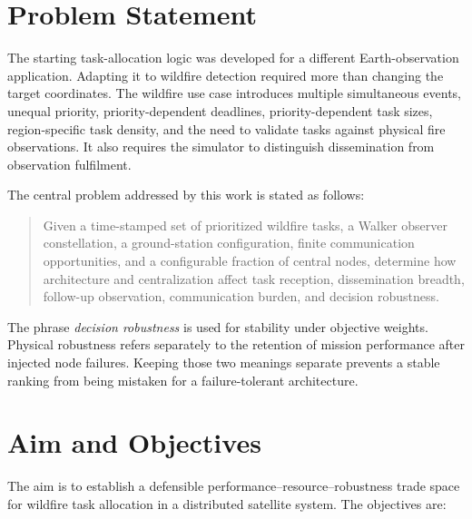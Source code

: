 \section{Problem Statement}

The starting task-allocation logic was developed for a different Earth-observation application. Adapting it to wildfire detection required more than changing the target coordinates. The wildfire use case introduces multiple simultaneous events, unequal priority, priority-dependent deadlines, priority-dependent task sizes, region-specific task density, and the need to validate tasks against physical fire observations. It also requires the simulator to distinguish dissemination from observation fulfilment.

The central problem addressed by this work is stated as follows:

\begin{quote}
Given a time-stamped set of prioritized wildfire tasks, a Walker observer constellation, a ground-station configuration, finite communication opportunities, and a configurable fraction of central nodes, determine how architecture and centralization affect task reception, dissemination breadth, follow-up observation, communication burden, and decision robustness.
\end{quote}

The phrase \emph{decision robustness} is used for stability under objective weights. Physical robustness refers separately to the retention of mission performance after injected node failures. Keeping those two meanings separate prevents a stable ranking from being mistaken for a failure-tolerant architecture.

\section{Aim and Objectives}

The aim is to establish a defensible performance--resource--robustness trade space for wildfire task allocation in a distributed satellite system. The objectives are:

